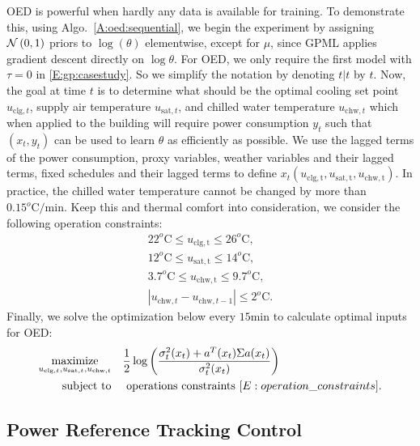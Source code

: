 OED is powerful when hardly any data is available for training. 
To demonstrate this, using Algo.~\ref{A:oed:sequential}, we begin the experiment by assigning \(\operatorname*{\mathcal{N}}\left(0, 1\right)\) priors to \(\log (\theta) \) elementwise, except for \(\mu\), since GPML applies gradient descent directly on \(\log \theta\).
For OED, we only require the first model with \(\tau=0\) in \eqref{E:gp:casestudy}. So we simplify the notation by denoting \(t|t\) by \(t\).
Now, the goal at time \(t\) is to determine what should be the optimal cooling set point \(u_{\mathrm{clg},t}\), supply air temperature \(u_{\mathrm{sat},t}\), and chilled water temperature \(u_{\mathrm{chw},t}\) which when applied to the building will require power consumption \(y_t\) such that \((x_t,y_t)\) can be used to learn \(\theta\) as efficiently as possible.
We use the lagged terms of the power consumption, proxy variables, weather variables and their lagged terms, fixed schedules and their lagged terms to define \(x_t(u_{\mathrm{clg,t}},u_{\mathrm{sat,t}},u_{\mathrm{chw,t}})\).
In practice, the chilled water temperature cannot be changed by more than \(0.15^o\mathrm{C/min}\). Keep this and thermal comfort into consideration, we consider the following operation constraints:
\begin{gather}
22^o\mathrm{C} \leq u_{\mathrm{clg,t}} \leq  26^o\mathrm{C}, \nonumber \\
12^o\mathrm{C} \leq u_{\mathrm{sat,t}} \leq  14^o\mathrm{C}, \nonumber \\
 3.7^o\mathrm{C} \leq u_{\mathrm{chw,t}} \leq  9.7^o\mathrm{C},\label{E:operation_constraints} \\
| u_{\mathrm{chw},t} - u_{\mathrm{chw},t-1}| \leq  2^o\mathrm{C}. \nonumber
\end{gather}
Finally, we solve the optimization below every \(15 \mathrm{min}\) to calculate optimal inputs for OED:
\begin{align}
\label{E:casestudy:oed}
\maximize_{u_{\mathrm{clg},t},u_{\mathrm{sat},t},u_{\mathrm{chw},t}} & \ \ \ \frac{1}{2}\log\left(\frac{\sigma^2_{t}(x_t)+a^T(x_t)\Sigma a(x_t)}{\sigma^2_{t}(x_t)}\right) \\
\st &  \ \ \ \  \text{operations constraints } \eqref{E:operation_constraints}.\nonumber
\end{align}


\subsection{Power Reference Tracking Control}
\label{SS:power_tracking}

